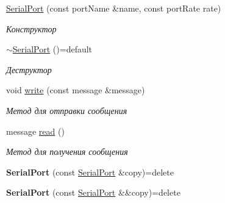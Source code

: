 \begin{DoxyCompactItemize}
\item 
\hyperlink{classJarvis_1_1Arduino_1_1Connection_1_1SerialPort_a9f327eb95493fa85c7db715b21ede8d0}{Serial\+Port} (const port\+Name \&name, const port\+Rate rate)
\begin{DoxyCompactList}\small\item\em Конструктор \end{DoxyCompactList}\item 
\mbox{\label{classJarvis_1_1Arduino_1_1Connection_1_1SerialPort_ab79a8590e02e3de7e469d5b6e915f84c}} 
\hyperlink{classJarvis_1_1Arduino_1_1Connection_1_1SerialPort_ab79a8590e02e3de7e469d5b6e915f84c}{$\sim$\+Serial\+Port} ()=default
\begin{DoxyCompactList}\small\item\em Деструктор \end{DoxyCompactList}\item 
void \hyperlink{classJarvis_1_1Arduino_1_1Connection_1_1SerialPort_aa83e438051a5b6b77e99a656633bd61c}{write} (const message \&message)
\begin{DoxyCompactList}\small\item\em Метод для отправки сообщения \end{DoxyCompactList}\item 
message \hyperlink{classJarvis_1_1Arduino_1_1Connection_1_1SerialPort_a484856dc39e0244a37bcd0f236595f5b}{read} ()
\begin{DoxyCompactList}\small\item\em Метод для получения сообщения \end{DoxyCompactList}\item 
\mbox{\label{classJarvis_1_1Arduino_1_1Connection_1_1SerialPort_a0485ff2bb3a26a941c0ba6aedefa4864}} 
{\bfseries Serial\+Port} (const \hyperlink{classJarvis_1_1Arduino_1_1Connection_1_1SerialPort}{Serial\+Port} \&copy)=delete
\item 
\mbox{\label{classJarvis_1_1Arduino_1_1Connection_1_1SerialPort_af485ac5e3d1e0e1146851961a30413ea}} 
{\bfseries Serial\+Port} (const \hyperlink{classJarvis_1_1Arduino_1_1Connection_1_1SerialPort}{Serial\+Port} \&\&copy)=delete
\item 
\mbox{\label{classJarvis_1_1Arduino_1_1Connection_1_1SerialPort_af3004d08c4ae6617468835b22f4f7f14}} 

\end{DoxyCompactItemize}
